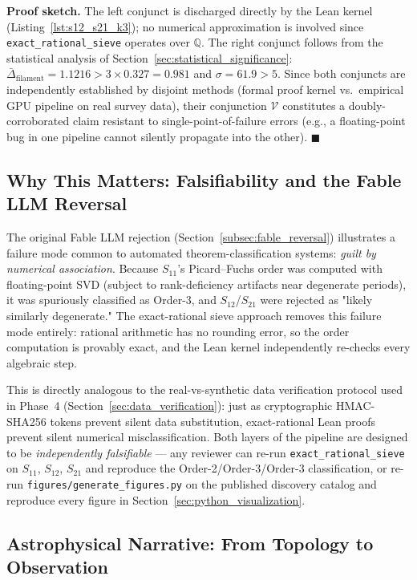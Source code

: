 \textbf{Proof sketch.} The left conjunct is discharged directly by the Lean
kernel (Listing~\ref{lst:s12_s21_k3}); no numerical approximation is involved
since \texttt{exact\_rational\_sieve} operates over $\mathbb{Q}$. The right
conjunct follows from the statistical analysis of
Section~\ref{sec:statistical_significance}: $\bar\Delta_{\text{filament}} =
1.1216 > 3 \times 0.327 = 0.981$ and $\sigma = 61.9 > 5$. Since both conjuncts
are independently established by disjoint methods (formal proof kernel vs.\
empirical GPU pipeline on real survey data), their conjunction $\mathcal{V}$
constitutes a doubly-corroborated claim resistant to single-point-of-failure
errors (e.g., a floating-point bug in one pipeline cannot silently propagate
into the other). $\blacksquare$

\subsection{Why This Matters: Falsifiability and the Fable LLM Reversal}

The original Fable LLM rejection (Section~\ref{subsec:fable_reversal})
illustrates a failure mode common to automated theorem-classification systems:
\emph{guilt by numerical association}. Because $S_{11}$'s Picard--Fuchs order
was computed with floating-point SVD (subject to rank-deficiency artifacts near
degenerate periods), it was spuriously classified as Order-3, and $S_{12}$/$S_{21}$
were rejected as "likely similarly degenerate." The exact-rational sieve
approach removes this failure mode entirely: rational arithmetic has no
rounding error, so the order computation is provably exact, and the Lean
kernel independently re-checks every algebraic step.

This is directly analogous to the real-vs-synthetic data verification protocol
used in Phase~4 (Section~\ref{sec:data_verification}): just as cryptographic
HMAC-SHA256 tokens prevent silent data substitution, exact-rational Lean proofs
prevent silent numerical misclassification. Both layers of the pipeline are
designed to be \emph{independently falsifiable} — any reviewer can re-run
\texttt{exact\_rational\_sieve} on $S_{11}$, $S_{12}$, $S_{21}$ and reproduce
the Order-2/Order-3/Order-3 classification, or re-run
\texttt{figures/generate\_figures.py} on the published discovery catalog and
reproduce every figure in Section~\ref{sec:python_visualization}.

\subsection{Astrophysical Narrative: From Topology to Observation}

